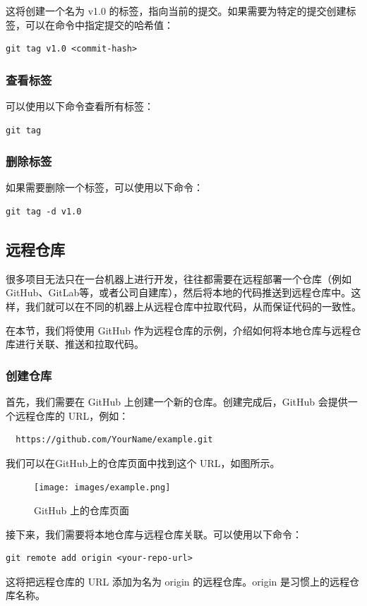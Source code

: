 \documentclass[../main.tex]{subfiles}
\begin{document}
这将创建一个名为 v1.0 的标签，指向当前的提交。如果需要为特定的提交创建标签，可以在命令中指定提交的哈希值：
\begin{verbatim}
git tag v1.0 <commit-hash>
\end{verbatim}

\subsubsection{查看标签}
可以使用以下命令查看所有标签：
\begin{verbatim}
git tag
\end{verbatim}

\subsubsection{删除标签}
如果需要删除一个标签，可以使用以下命令：
\begin{verbatim}
git tag -d v1.0
\end{verbatim}

\subsection{远程仓库}

很多项目无法只在一台机器上进行开发，往往都需要在远程部署一个仓库（例如GitHub、GitLab等，或者公司自建库），然后将本地的代码推送到远程仓库中。这样，我们就可以在不同的机器上从远程仓库中拉取代码，从而保证代码的一致性。

在本节，我们将使用 GitHub 作为远程仓库的示例，介绍如何将本地仓库与远程仓库进行关联、推送和拉取代码。

\subsubsection{创建仓库}
首先，我们需要在 GitHub 上创建一个新的仓库。创建完成后，GitHub 会提供一个远程仓库的 URL，例如：
\begin{verbatim}
  https://github.com/YourName/example.git
\end{verbatim}
我们可以在GitHub上的仓库页面中找到这个 URL，如图所示。

\begin{figure}[htbp]
\centering
\texttt{[image: images/example.png]}
\caption{GitHub 上的仓库页面}
\label{fig:github-repo}
\end{figure}

接下来，我们需要将本地仓库与远程仓库关联。可以使用以下命令：
\begin{verbatim}
git remote add origin <your-repo-url>
\end{verbatim}
这将把远程仓库的 URL 添加为名为 origin 的远程仓库。origin 是习惯上的远程仓库名称。
\end{document}
